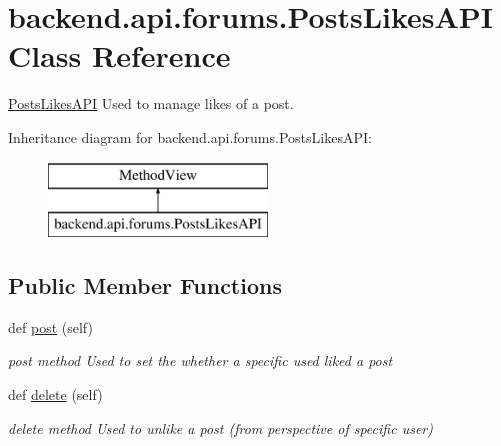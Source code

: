 \hypertarget{classbackend_1_1api_1_1forums_1_1_posts_likes_a_p_i}{}\section{backend.\+api.\+forums.\+Posts\+Likes\+A\+P\+I Class Reference}
\label{classbackend_1_1api_1_1forums_1_1_posts_likes_a_p_i}


\hyperlink{classbackend_1_1api_1_1forums_1_1_posts_likes_a_p_i}{Posts\+Likes\+A\+P\+I} Used to manage likes of a post.  


Inheritance diagram for backend.\+api.\+forums.\+Posts\+Likes\+A\+P\+I\+:\begin{figure}[H]
\begin{center}
\leavevmode
\includegraphics[height=2.000000cm]{classbackend_1_1api_1_1forums_1_1_posts_likes_a_p_i}
\end{center}
\end{figure}
\subsection*{Public Member Functions}
\begin{DoxyCompactItemize}
\item 
\hypertarget{classbackend_1_1api_1_1forums_1_1_posts_likes_a_p_i_ae512430e572b1889f80f8f8f67afc9f9}{}def \hyperlink{classbackend_1_1api_1_1forums_1_1_posts_likes_a_p_i_ae512430e572b1889f80f8f8f67afc9f9}{post} (self)\label{classbackend_1_1api_1_1forums_1_1_posts_likes_a_p_i_ae512430e572b1889f80f8f8f67afc9f9}

\begin{DoxyCompactList}\small\item\em post method Used to set the whether a specific used liked a post \end{DoxyCompactList}\item 
\hypertarget{classbackend_1_1api_1_1forums_1_1_posts_likes_a_p_i_a983b2932fa349ef2f4829420354221dc}{}def \hyperlink{classbackend_1_1api_1_1forums_1_1_posts_likes_a_p_i_a983b2932fa349ef2f4829420354221dc}{delete} (self)\label{classbackend_1_1api_1_1forums_1_1_posts_likes_a_p_i_a983b2932fa349ef2f4829420354221dc}

\begin{DoxyCompactList}\small\item\em delete method Used to unlike a post (from perspective of specific user) \end{DoxyCompactList}\end{DoxyCompactItemize}



